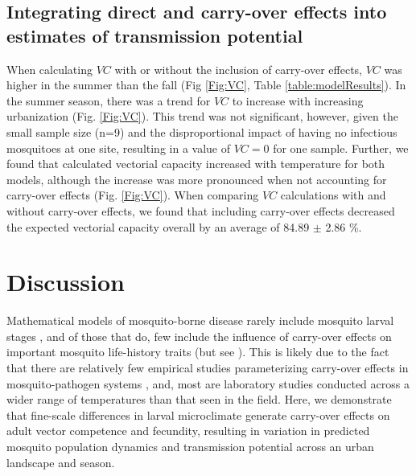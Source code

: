 \documentclass[12pt]{article}
\begin{document}
\subsection{Integrating direct and carry-over effects into estimates of transmission potential}

When calculating $VC$ with or without the inclusion of carry-over effects, $VC$ was higher in the summer than the fall (Fig \ref{Fig:VC}, Table \ref{table:modelResults}). In the summer season, there was a trend for $VC$ to increase with increasing urbanization (Fig. \ref{Fig:VC}). This trend was not significant, however, given the small sample size (n=9) and the disproportional impact of having no infectious mosquitoes at one site, resulting in a value of $VC=0$ for one sample. Further, we found that calculated vectorial capacity increased with temperature for both models, although the increase was more pronounced when not accounting for carry-over effects (Fig. \ref{Fig:VC}). When comparing $VC$ calculations with and without carry-over effects, we found that including carry-over effects decreased the expected vectorial capacity overall by an average of 84.89 $\pm$ 2.86 \%.

\section{Discussion}

Mathematical models of mosquito-borne disease rarely include mosquito larval stages \citep{reiner2013}, and of those that do, few include the influence of carry-over effects on important mosquito life-history traits (but see \citep{roux2015a}). This is likely due to the fact that there are relatively few empirical studies parameterizing  carry-over effects in mosquito-pathogen systems \citep{parham2015}, and, most  are laboratory studies conducted across a wider range of temperatures than that seen in the field. Here, we demonstrate that fine-scale differences in larval microclimate generate carry-over effects on adult vector competence and fecundity, resulting in variation in predicted mosquito population dynamics and transmission potential across an urban landscape and season.
\end{document}
